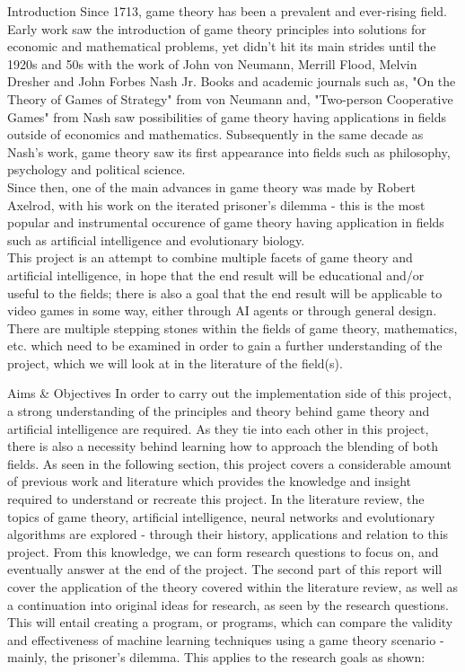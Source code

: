 \documentclass[12pt,a4paper]{article}
\makeatletter
\renewcommand\subsection{\@startsection {subsection}{1}{2mm}
                               {3pt plus 2pt minus 1pt}
                               {3pt plus 0pt}
                               {\normalfont\bfseries}}
\renewcommand\section{\@startsection {section}{1}{0mm}
                               {4pt plus 2pt minus 1pt}
                               {4pt plus 0pt}
                               {\bfseries}}
\makeatother
\begin{document}
\section{Introduction}
Since 1713, game theory has been a prevalent and ever-rising field. Early work saw the introduction of game theory principles into solutions for economic and mathematical problems, yet didn't hit its main strides until the 1920s and 50s with the work of John von Neumann, Merrill Flood, Melvin Dresher and John Forbes Nash Jr. Books and academic journals such as, "On the Theory of Games of Strategy" from von Neumann and, "Two-person Cooperative Games" from Nash saw possibilities of game theory having applications in fields outside of economics and mathematics. Subsequently in the same decade as Nash's work, game theory saw its first appearance into fields such as philosophy, psychology and political science. \\
Since then, one of the main advances in game theory was made by Robert Axelrod, with his work on the iterated prisoner's dilemma - this is the most popular and instrumental occurence of game theory having application in fields such as artificial intelligence and evolutionary biology. \\
This project is an attempt to combine multiple facets of game theory and artificial intelligence, in hope that the end result will be educational and/or useful to the fields; there is also a goal that the end result will be applicable to video games in some way, either through AI agents or through general design. There are multiple stepping stones within the fields of game theory, mathematics, etc. which need to be examined in order to gain a further understanding of the project, which we will look at in the literature of the field(s).

\subsection{Aims \& Objectives}
In order to carry out the implementation side of this project, a strong understanding of the principles and theory behind game theory and artificial intelligence are required. As they tie into each other in this project, there is also a necessity behind learning how to approach the blending of both fields. As seen in the following section, this project covers a considerable amount of previous work and literature which provides the knowledge and insight required to understand or recreate this project. In the literature review, the topics of game theory, artificial intelligence, neural networks and evolutionary algorithms are explored - through their history, applications and relation to this project. From this knowledge, we can form research questions to focus on, and eventually answer at the end of the project. The second part of this report will cover the application of the theory covered within the literature review, as well as a continuation into original ideas for research, as seen by the research questions. This will entail creating a program, or programs, which can compare the validity and effectiveness of machine learning techniques using a game theory scenario - mainly, the prisoner's dilemma. This applies to the research goals as shown: \\
\end{document}
